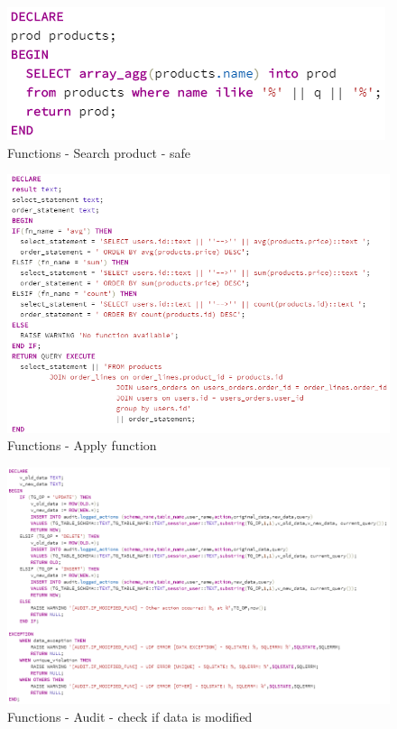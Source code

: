 \documentclass{article}
\begin{document}
\begin{figure}
\centering
\includegraphics[scale=1]{f5}
\caption{Functions - Search product - safe}
\end{figure}
\begin{figure}
\centering
\includegraphics[scale=0.8]{f6}
\caption{Functions - Apply function}
\end{figure}
\begin{figure}
\centering
\includegraphics[scale=0.8]{f7}
\caption{Functions - Audit - check if data is modified}
\end{figure}
\end{document}
